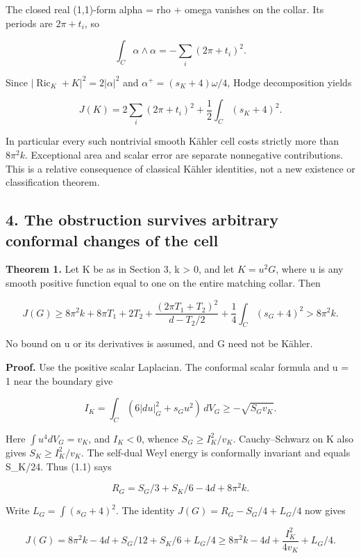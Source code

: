 \documentclass[
  10pt,
]{article}
\begin{document}
The closed real (1,1)-form alpha = rho + omega vanishes on the collar.
Its periods are \(2\pi+t_i\), so

\[
 \int_C\alpha\wedge\alpha=-\sum_i(2\pi+t_i)^2.
\]

Since \(|\operatorname{Ric}_K+K|^2=2|\alpha|^2\) and
\(\alpha^+=(s_K+4)\omega/4\), Hodge decomposition yields

\[
 \boxed{J(K)=2\sum_i(2\pi+t_i)^2
                    +\frac12\int_C(s_K+4)^2.}             \tag{3.2}
\]

In particular every such nontrivial smooth Kähler cell costs strictly
more than \(8\pi^2k\). Exceptional area and scalar error are separate
nonnegative contributions. This is a relative consequence of classical
Kähler identities, not a new existence or classification theorem.

\hypertarget{the-obstruction-survives-arbitrary-conformal-changes-of-the-cell}{%
\subsection{4. The obstruction survives arbitrary conformal changes of
the
cell}\label{the-obstruction-survives-arbitrary-conformal-changes-of-the-cell}}

\textbf{Theorem 1.} Let K be as in Section 3, k \textgreater{} 0, and
let \(K=u^2G\), where u is any smooth positive function equal to one on
the entire matching collar. Then

\[
 \boxed{J(G)\ge 8\pi^2k+8\pi T_1+2T_2
       +\frac{(2\pi T_1+T_2)^2}{d-T_2/2}
       +\frac14\int_C(s_G+4)^2>8\pi^2k.}                 \tag{4.1}
\]

No bound on u or its derivatives is assumed, and G need not be Kähler.

\textbf{Proof.} Use the positive scalar Laplacian. The conformal scalar
formula and u = 1 near the boundary give

\[
 I_K=\int_C(6|du|_G^2+s_Gu^2)\,dV_G
       \ge-\sqrt{S_Gv_K}.
\]

Here \(\int u^4dV_G=v_K\), and \(I_K<0\), whence \(S_G\ge I_K^2/v_K\).
Cauchy--Schwarz on K also gives \(S_K\ge I_K^2/v_K\). The self-dual Weyl
energy is conformally invariant and equals S\_K/24. Thus (1.1) says

\[
 R_G=S_G/3+S_K/6-4d+8\pi^2k.
\]

Write \(L_G=\int(s_G+4)^2\). The identity \(J(G)=R_G-S_G/4+L_G/4\) now
gives

\[
 J(G)=8\pi^2k-4d+S_G/12+S_K/6+L_G/4
       \ge8\pi^2k-4d+\frac{I_K^2}{4v_K}+L_G/4.
\]
\end{document}
